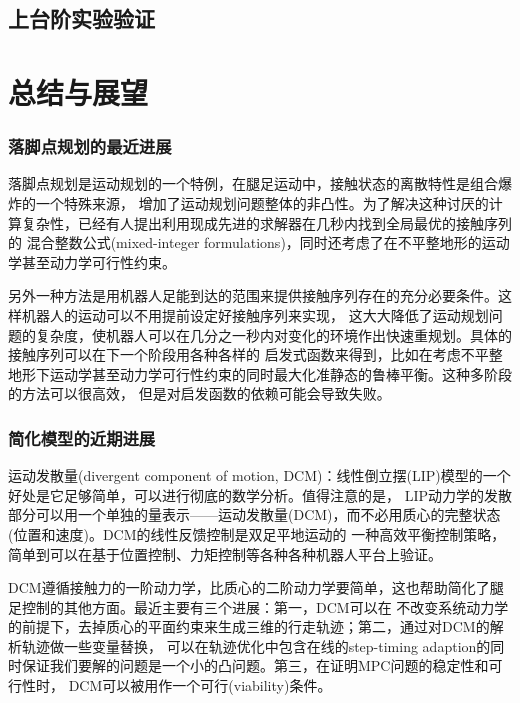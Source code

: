 \section{上台阶实验验证}
\label{stair_experiment}

\chapter{总结与展望}

\subsection{落脚点规划的最近进展}
落脚点规划是运动规划的一个特例，在腿足运动中，接触状态的离散特性是组合爆炸的一个特殊来源，
增加了运动规划问题整体的非凸性。为了解决这种讨厌的计算复杂性，已经有人提出利用现成先进的求解器在几秒内找到全局最优的接触序列的
混合整数公式(mixed-integer formulations)，同时还考虑了在不平整地形的运动学甚至动力学可行性约束\cite{aceituno2017simultaneous}。

另外一种方法是用机器人足能到达的范围来提供接触序列存在的充分必要条件。这样机器人的运动可以不用提前设定好接触序列来实现，
这大大降低了运动规划问题的复杂度，使机器人可以在几分之一秒内对变化的环境作出快速重规划。具体的接触序列可以在下一个阶段用各种各样的
启发式函数来得到，比如在考虑不平整地形下运动学甚至动力学可行性约束的同时最大化准静态的鲁棒平衡\cite{tonneau2018efficient}。这种多阶段的方法可以很高效，
但是对启发函数的依赖可能会导致失败。

\subsection{简化模型的近期进展}
运动发散量(divergent component of motion, DCM)：线性倒立摆(LIP)模型的一个好处是它足够简单，可以进行彻底的数学分析。值得注意的是，
LIP动力学的发散部分可以用一个单独的量表示——运动发散量(DCM)，而不必用质心的完整状态(位置和速度)。DCM的线性反馈控制是双足平地运动的
一种高效平衡控制策略\cite{kajita2010biped}，简单到可以在基于位置控制、力矩控制等各种各种机器人平台上验证。

DCM遵循接触力的一阶动力学，比质心的二阶动力学要简单，这也帮助简化了腿足控制的其他方面。最近主要有三个进展：第一，DCM可以在
不改变系统动力学的前提下，去掉质心的平面约束来生成三维的行走轨迹\cite{englsberger2015three}；第二，通过对DCM的解析轨迹做一些变量替换，
可以在轨迹优化中包含在线的step-timing adaption的同时保证我们要解的问题是一个小的凸问题\cite{khadiv2020walking}。第三，在证明MPC问题的稳定性和可行性时，
DCM可以被用作一个可行(viability)条件。

